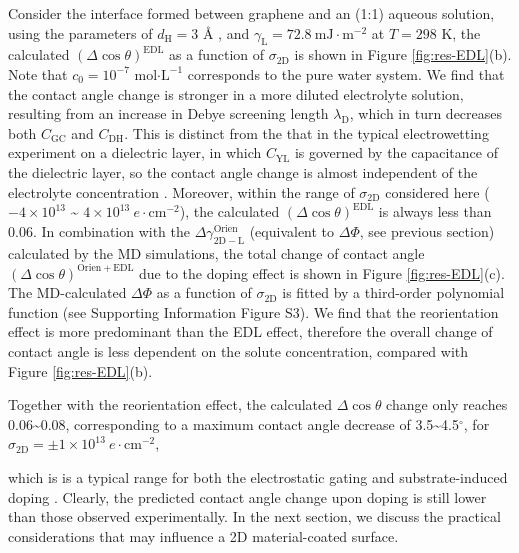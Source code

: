 \documentclass[journal=jacsat,manuscript=article,email=true]{achemso}
\begin{document}
Consider the interface formed between graphene and an (1:1) aqueous
solution, using the parameters of \(d_{\mathrm{H}}=3\) Å
\cite{mcclendon_thickness_1927}, and \(\gamma_{\mathrm{L}}=72.8\
\mathrm{mJ}\cdot \mathrm{m}^{-2}\) at \(T=298\) K, the calculated
\((\Delta \cos \theta)^{\mathrm{EDL}}\) as a function of
\(\sigma_{\mathrm{2D}}\) is shown in Figure \ref{fig:res-EDL}(b).  Note
that \(c_{0}=10^{-7}\) mol\(\cdot \mathrm{L}^{-1}\) corresponds to the
pure water system. We find that the contact angle change is
stronger in a more diluted electrolyte solution, resulting from an
increase in Debye screening length \(\lambda_{\mathrm{D}}\), which
in turn decreases both \(C_{\mathrm{GC}}\) and \(C_{\mathrm{DH}}\). This
is distinct from the that in the typical electrowetting experiment on
a dielectric layer, in which \(C_{\mathrm{YL}}\) is governed by the
capacitance of the dielectric layer, so the contact angle change is
almost independent of the electrolyte concentration
\cite{Mugele_2005}. Moreover, within the range of \(\sigma_{\mathrm{2D}}\)
considered here (\(-4\times10^{13}\) \textasciitilde{} \(4\times10^{13}\ e\cdot
\mathrm{cm}^{-2}\)), the calculated \((\Delta \cos
\theta)^{\mathrm{EDL}}\) is always less than 0.06.  In combination with
the \(\Delta \gamma^{\mathrm{Orien}}_{\mathrm{2D-L}}\) (equivalent to
\(\Delta \Phi\), see previous section) calculated by the MD simulations,
the total change of contact angle \((\Delta \cos
\theta)^{\mathrm{Orien + EDL}}\) due to the doping effect is shown in
Figure \ref{fig:res-EDL}(c). The MD-calculated \(\Delta \Phi\) as
a function of \(\sigma_{\mathrm{2D}}\) is fitted by a third-order
polynomial function (see Supporting Information Figure S3).  We find
that the reorientation effect is more predominant than the EDL effect,
therefore the overall change of contact angle is less dependent on the
solute concentration, compared with Figure \ref{fig:res-EDL}(b).

Together with the reorientation effect, the calculated \(\Delta \cos
\theta\) change only reaches 0.06\textasciitilde{}0.08, corresponding to a maximum
contact angle decrease of 3.5\textasciitilde{}4.5\(^{\circ}\), for
\(\sigma_{\mathrm{2D}}=\pm1\times10^{13}\ e\cdot \mathrm{cm}^{-2}\), 

which is is a typical range for both the electrostatic gating
\cite{hong_mechanism_2016} and substrate-induced doping
\cite{ashraf_doping-induced_2016}. Clearly, the predicted contact angle
change upon doping is still lower than those observed
experimentally. In the next section, we discuss the practical
considerations that may influence a 2D material-coated surface.
\end{document}
